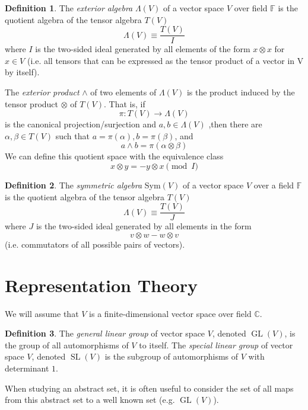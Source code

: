 \documentclass{article}
\DeclareMathOperator{\GL}{GL}
\DeclareMathOperator{\SL}{SL}
\theoremstyle{remark}
\theoremstyle{definition}
\newtheorem{definition}{Definition}[section]
\begin{document}
\begin{definition}
The \textit{exterior algebra} $\Lambda(V)$ of a vector space $V$ over field $\mathbb{F}$ is the quotient algebra of the tensor algebra $T(V)$
\[\Lambda(V) \equiv \frac{T(V)}{I}\]
where $I$ is the two-sided ideal generated by all elements of the form $x \otimes x$ for $x \in V$ (i.e. all tensors that can be expressed as the tensor product of a vector in V by itself). 

The \textit{exterior product} $\wedge$ of two elements of $\Lambda(V)$ is the product induced by the tensor product $\otimes$ of $T(V)$. That is, if 
\[\pi: T(V) \longrightarrow \Lambda(V)\]
is the canonical projection/surjection and $a, b \in \Lambda(V)$ ,then there are $\alpha, \beta \in T(V)$ such that $a = \pi(\alpha), b = \pi(\beta)$, and 
\[a \wedge b = \pi(\alpha \otimes \beta)\]
We can define this quotient space with the equivalence class
\[x \otimes y = - y \otimes x \pmod{I}\]
\end{definition}

\begin{definition}
The \textit{symmetric algebra} Sym$(V)$ of a vector space $V$ over a field $\mathbb{F}$ is the quotient algebra of the tensor algebra $T(V)$ 
\[\Lambda(V) \equiv \frac{T(V)}{J}\]
where $J$ is the two-sided ideal generated by all elements in the form 
\[v \otimes w - w \otimes v\]
(i.e. commutators of all possible pairs of vectors). 
\end{definition}

\section{Representation Theory}
We will assume that $V$ is a finite-dimensional vector space over field $\mathbb{C}$. 
\begin{definition}
The \textit{general linear group} of vector space $V$, denoted $\GL(V)$, is the group of all automorphisms of $V$ to itself. The \textit{special linear group} of vector space $V$, denoted $\SL(V)$ is the subgroup of automorphisms of $V$ with determinant $1$. 
\end{definition}
When studying an abstract set, it is often useful to consider the set of all maps from this abstract set to a well known set (e.g. $\GL(V)$). 
\end{document}

